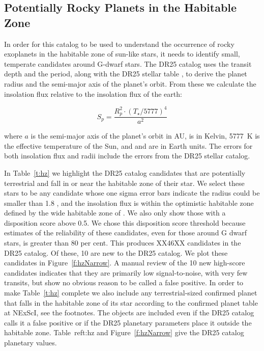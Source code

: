\label{s:hz}
\subsection{Potentially Rocky Planets in the Habitable Zone}
In order for this catalog to be used to understand the occurrence of rocky exoplanets in the habitable zone of sun-like stars, it needs to identify small, temperate candidates around G-dwarf stars.  The DR25 catalog uses the transit depth and the period, along with the DR25 stellar table \citet{Mathur2017ApJS}, to derive the planet radius and the semi-major axis of the planet's orbit.  From these we calculate the insolation flux relative to the insolation flux of the earth:

\begin{equation}
S_{p} = \frac{R_{p}^{2} \cdot (T_{\star}/5777)^{4}}{a^{2}}
\end{equation}

\noindent where $a$ is the semi-major axis of the planet's orbit in AU, \tstar{} is in Kelvin, 5777~K is the effective temperature of the Sun, and \sp{} and \rp{} are in Earth units. The errors for both insolation flux and radii include the errors from the DR25 stellar catalog. 

In Table~\ref{t:hz} we highlight the DR25 catalog candidates that are potentially terrestrial and fall in or near the habitable zone of their star.  We select these stars to be any candidate whose one sigma error bars indicate the radius could be smaller than 1.8 \re, and the insolation flux is within the optimistic habitable zone defined by the wide habitable zone of \citet{Kopparapu2013}.  We also only show those with a disposition score above 0.5.  We chose this disposition score threshold because estimates of the reliability of these candidates, even for those around G dwarf stars, is greater than 80 per cent.  This produces XX46XX candidates in the DR25 catalog. Of these, 10 are new to the DR25 catalog. We plot these candidates in Figure~\ref{f:hzNarrow}.  A manual review of the 10 new high-score candidates indicates that they are primarily low signal-to-noise, with very few transits, but show no obvious reason to be called a false positive. In order to make Table~\ref{t:hz} complete we also include any terrestrial-sized confirmed planet that falls in the habitable zone of its star according to the confirmed planet table at NExScI, see the footnotes. The objects are included even if the DR25 catalog calls it a false positive or if the DR25 planetary parameters place it outside the habitable zone. Table~ref{t:hz} and Figure~\ref{f:hzNarrow} give the DR25 catalog planetary values.



